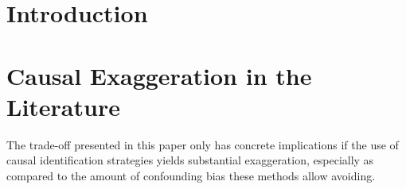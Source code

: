 \documentclass[usletter, 12pt]{article}
\begin{document}
	\section{Introduction}
	
		
	



	\section{Causal Exaggeration in the Literature}\label{lit_review}
	
		The trade-off presented in this paper only has concrete implications if the use of causal identification strategies yields substantial exaggeration, especially as compared to the amount of confounding bias these methods allow avoiding. 
		
\end{document}
